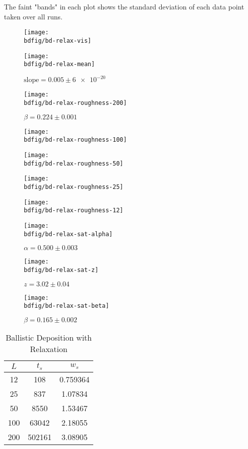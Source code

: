 \documentclass[12pt,a4paper]{article}
\newcommand{\bdfig}{../fig/ballistic-deposition}
\begin{document}
    The faint "bands" in each plot shows the standard deviation of each data point taken over all runs.
    \begin{figure}
        \centering
        \texttt{[image: \\bdfig/bd-relax-vis]}
    \end{figure}
    \begin{figure}
        \centering
        \texttt{[image: \\bdfig/bd-relax-mean]}
        \caption{$\text{slope}=0.005\pm\num{6e-20}$}
    \end{figure}
    \begin{figure}
        \centering
        \texttt{[image: \\bdfig/bd-relax-roughness-200]}
        \caption{$\beta=0.224\pm0.001$}
    \end{figure}
    \begin{figure}
        \centering
        \texttt{[image: \\bdfig/bd-relax-roughness-100]}
    \end{figure}
    \begin{figure}
        \centering
        \texttt{[image: \\bdfig/bd-relax-roughness-50]}
    \end{figure}
    \begin{figure}
        \centering
        \texttt{[image: \\bdfig/bd-relax-roughness-25]}
    \end{figure}
    \begin{figure}
        \centering
        \texttt{[image: \\bdfig/bd-relax-roughness-12]}
    \end{figure}
    \begin{figure}
        \centering
        \texttt{[image: \\bdfig/bd-relax-sat-alpha]}
        \caption{$\alpha = 0.500\pm0.003$}
    \end{figure}
    \begin{figure}
        \centering
        \texttt{[image: \\bdfig/bd-relax-sat-z]}
        \caption{$z = 3.02\pm0.04$}
    \end{figure}
    \begin{figure}
        \centering
        \texttt{[image: \\bdfig/bd-relax-sat-beta]}
        \caption{$\beta = 0.165\pm0.002$}
    \end{figure}
    \restoregeometry
    \begin{table}[htb!]
        \centering
        \caption{Ballistic Deposition with Relaxation}
        \begin{tabular}{|c|c|c|}
            \hline
            $L$ & $t_s$ & $w_s$ \\
            \hline
            12 & 108 & 0.759364 \\
            \hline
            25 & 837 & 1.07834 \\
            \hline
            50 & 8550 & 1.53467 \\
            \hline
            100 & 63042 & 2.18055 \\
            \hline
            200 & 502161 & 3.08905 \\
            \hline
        \end{tabular}
    \end{table}
\end{document}
